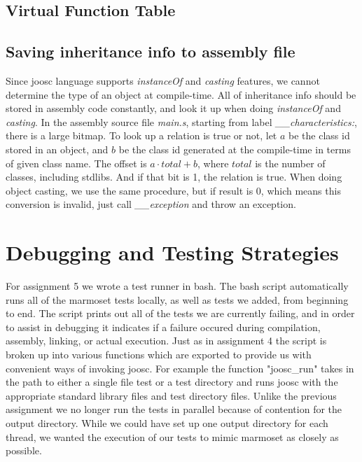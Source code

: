 \documentclass[12pt,letterpaper]{article}
\begin{document}
\subsection{Virtual Function Table}

\subsection{Saving inheritance info to assembly file}
Since joosc language supports \emph{instanceOf} and \emph{casting} features, we cannot determine the type of an object at compile-time.
All of inheritance info should be stored in assembly code constantly, and look it up when doing \emph{instanceOf} and \emph{casting}.
In the assembly source file \emph{main.s}, starting from label \emph{\_\_characteristics:}, there is a large bitmap.
To look up a relation is true or not, let $a$ be the class id stored in an object, and $b$ be the class id generated at the compile-time in terms of given class name.
The offset is $a \cdot total + b$, where $total$ is the number of classes, including stdlibs.
And if that bit is 1, the relation is true.
When doing object casting, we use the same procedure, but if result is 0, which means this conversion is invalid, just call \emph{\_\_exception} and throw an exception.

\section{Debugging and Testing Strategies}
For assignment 5 we wrote a test runner in bash.
The bash script automatically runs all of the marmoset tests locally, as well as tests we added, from beginning to end.
The script prints out all of the tests we are currently failing, and in order to assist in debugging it indicates if a failure occured during compilation, assembly, linking, or actual execution.
Just as in assignment 4 the script is broken up into various functions which are exported to provide us with convenient ways of invoking joosc.
For example the function "joosc\_run" takes in the path to either a single file test or a test directory and runs joosc with the appropriate standard library files and test directory files.
Unlike the previous assignment we no longer run the tests in parallel because of contention for the output directory.
While we could have set up one output directory for each thread, we wanted the execution of our tests to mimic marmoset as closely as possible.
\end{document}

